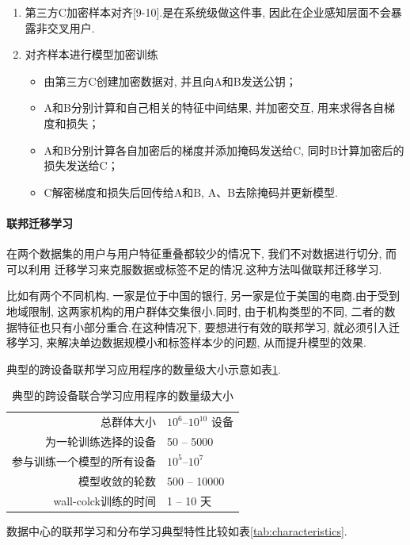 \documentclass[a4paper]{article}
\theoremstyle{definition}
\numberwithin{equation}{section}
\begin{document}
\begin{enumerate}
    \item  第三方C加密样本对齐[9-10].是在系统级做这件事, 因此在企业感知层面不会暴露非交叉用户.
    \item 对齐样本进行模型加密训练
    \begin{itemize}
        \item 由第三方C创建加密数据对, 并且向A和B发送公钥；
        \item A和B分别计算和自己相关的特征中间结果, 并加密交互, 用来求得各自梯度和损失；
        \item A和B分别计算各自加密后的梯度并添加掩码发送给C, 同时B计算加密后的损失发送给C；
        \item C解密梯度和损失后回传给A和B, A、B去除掩码并更新模型.
    \end{itemize}
\end{enumerate}
\paragraph{联邦迁移学习}
在两个数据集的用户与用户特征重叠都较少的情况下, 我们不对数据进行切分, 而可以利用 迁移学习\citep{pan2009survey}来克服数据或标签不足的情况.这种方法叫做联邦迁移学习.

比如有两个不同机构, 一家是位于中国的银行, 另一家是位于美国的电商.由于受到地域限制, 这两家机构的用户群体交集很小.同时, 由于机构类型的不同, 二者的数据特征也只有小部分重合.在这种情况下, 要想进行有效的联邦学习, 就必须引入迁移学习, 来解决单边数据规模小和标签样本少的问题, 从而提升模型的效果.

典型的跨设备联邦学习应用程序的数量级大小示意如表\ref{tab:sizes}.
 
\begin{table}
    \centering
    \renewcommand{\arraystretch}{1.2}
    \begin{tabular}{rl}    
    \toprule
    总群体大小 &  $10^6$--$10^{10}$ 设备\\
    为一轮训练选择的设备 & 50 -- 5000 \\
    参与训练一个模型的所有设备 & $10^5$--$10^7$  \\
    模型收敛的轮数 & 500 -- 10000 \\
    wall-colck训练的时间 & 1 -- 10 天 \\ 
    \bottomrule 
    \end{tabular}
    \caption{典型的跨设备联合学习应用程序的数量级大小}
    \label{tab:sizes}
\end{table}


数据中心的联邦学习和分布学习典型特性比较如表\ref{tab:characteristics}.
%
 
\end{document}
